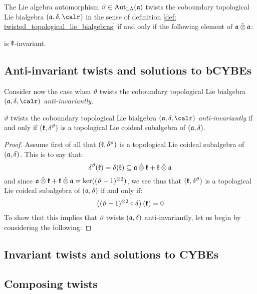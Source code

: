         \begin{proposition} \label{prop: invariance_criteria_for_coboundary_topological_lie_bialgebra_twists}
            The Lie algebra automorphism $\vartheta \in \operatorname{Aut}_{\mathrm{LA}}(\mathfrak{a})$ twists the coboundary topological Lie bialgebra $(\a, \delta, \calr)$ in the sense of definition \ref{def: twisted_topological_lie_bialgebras} if and only if the following element of $\a \hattensor \a$:
                
            is $\mathfrak{k}$-invariant.
        \end{proposition}

    \subsection{Anti-invariant twists and solutions to bCYBEs} \label{subsection: anti_invariantly_twisted_coboundary_topological_lie_bialgebras}
        Consider now the case when $\vartheta$ twists the coboundary  topological Lie bialgebra $(\a, \delta, \calr)$ \textit{anti-invariantly}.
        \begin{proposition} \label{prop: anti_invariantly_twisted_coboundary_lie_bialgebras_are_lie_coideal_subalgebras}
            $\vartheta$ twists the coboundary topological Lie bialgebra $(\a, \delta, \calr)$ \textit{anti-invariantly} if and only if $(\mathfrak{k}, \delta^{\vartheta})$ is a topological Lie coideal subalgebra of $(\mathfrak{a}, \delta)$.
        \end{proposition}
            \begin{proof}
                Assume first of all that $(\mathfrak{k}, \delta^{\vartheta})$ is a topological Lie coideal subalgebra of $(\mathfrak{a}, \delta)$. This is to say that:
                    $$\delta^{\vartheta}(\k) = \delta(\k) \subseteq \a \hattensor \k + \k \hattensor \a$$
                and since $\a \hattensor \k + \k \hattensor \a = \ker( (\vartheta - 1)^{\tensor 2} )$, we see thus that $(\mathfrak{k}, \delta^{\vartheta})$ is a topological Lie coideal subalgebra of $(\mathfrak{a}, \delta)$ if and only if:
                    $$\left( (\vartheta - 1)^{\tensor 2} \circ \delta \right)(\k) = 0$$
                To show that this implies that $\vartheta$ twists $(\mathfrak{a}, \delta)$ anti-invariantly, let us begin by considering the following:
            \end{proof}


    \subsection{Invariant twists and solutions to CYBEs} \label{subsection: invariantly_twisted_coboundary_topological_lie_bialgebras}


    \subsection{Composing twists} \label{subsection: composing_twists_of_lie_bialgebras}